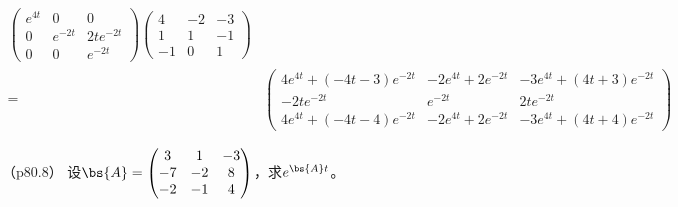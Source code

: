 \documentclass[12pt, a4paper, oneside, UTF8]{ctexbook}
\begin{document}
\begin{solution}
\begin{align*}
\begin{pmatrix}
        e^{4t}& 0 & 0 \\
        0 & e^{-2t} & 2te^{-2t} \\
        0& 0 &e^{-2t}
    \end{pmatrix}
    \begin{pmatrix}
        4 & -2 &-3 \\
        1 & 1 &-1 \\
        -1 & 0 & 1        
    \end{pmatrix}\\
    =&\begin{pmatrix}
        4e^{4t}+(-4t-3)e^{-2t}& -2e^{4t}+2e^{-2t} & -3e^{4t}+(4t+3)e^{-2t} \\
        -2te^{-2t} & e^{-2t} & 2te^{-2t} \\
        4e^{4t}+(-4t-4)e^{-2t}& -2e^{4t}+2e^{-2t} &-3e^{4t}+(4t+4)e^{-2t} 
    \end{pmatrix}
    \end{align*}
\end{solution}

\begin{question}（p80.8）
    设$\bs{A}=\begin{pmatrix}
        3 &1 &  -3 \\
        -7 & -2 & 8 \\
        -2 & -1 & 4
    \end{pmatrix}$，求$e^{\bs{A}t}$。
\end{question}
\end{document}
